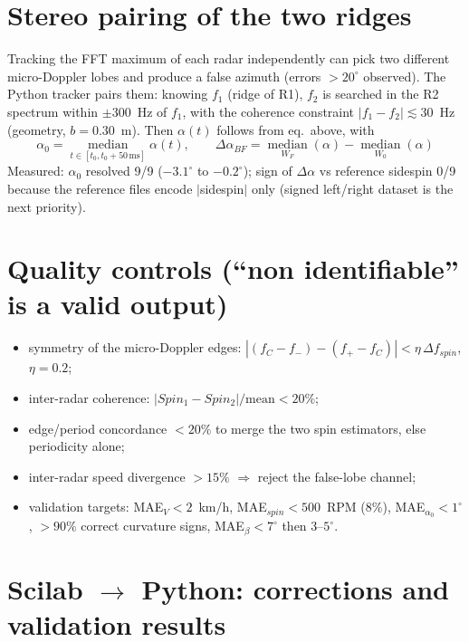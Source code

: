 \documentclass[10pt,a4paper]{report}
\begin{document}
\section{Stereo pairing of the two ridges}

Tracking the FFT maximum of each radar independently can pick two different micro-Doppler lobes and produce a false azimuth (errors $>20^\circ$ observed). The Python tracker pairs them: knowing $f_1$ (ridge of R1), $f_2$ is searched in the R2 spectrum within $\pm 300$~Hz of $f_1$, with the coherence constraint $|f_1-f_2| \lesssim 30$~Hz (geometry, $b=0.30$~m). Then $\alpha(t)$ follows from eq.\ above, with
\begin{equation}
\alpha_0 = \operatorname*{median}_{t\in[t_0,t_0+50\,\text{ms}]}\alpha(t), \qquad
\Delta\alpha_{BF} = \operatorname*{median}_{W_F}(\alpha) - \operatorname*{median}_{W_0}(\alpha)
\end{equation}
Measured: $\alpha_0$ resolved 9/9 ($-3.1^\circ$ to $-0.2^\circ$); sign of $\Delta\alpha$ vs reference sidespin 0/9 because the reference files encode $|$sidespin$|$ only (signed left/right dataset is the next priority).

\section{Quality controls (``non identifiable'' is a valid output)}
\begin{itemize}
  \item symmetry of the micro-Doppler edges: $|(f_C-f_-)-(f_+-f_C)| < \eta\,\Delta f_{spin}$, $\eta=0.2$;
  \item inter-radar coherence: $|Spin_1-Spin_2|/\mathrm{mean} < 20\%$;
  \item edge/period concordance $<20\%$ to merge the two spin estimators, else periodicity alone;
  \item inter-radar speed divergence $>15\%$ $\Rightarrow$ reject the false-lobe channel;
  \item validation targets: MAE$_V<2$~km/h, MAE$_{spin}<500$~RPM (8\%), MAE$_{\alpha_0}<1^\circ$, $>90\%$ correct curvature signs, MAE$_\beta<7^\circ$ then $3$--$5^\circ$.
\end{itemize}

\section{Scilab $\rightarrow$ Python: corrections and validation results}
\end{document}
